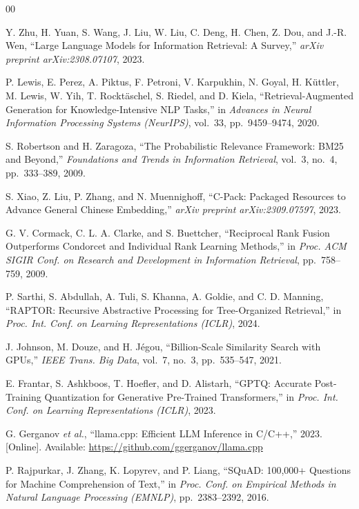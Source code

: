 \documentclass[conference]{IEEEtran}
\begin{document}
\begin{thebibliography}{00}

Y. Zhu, H. Yuan, S. Wang, J. Liu, W. Liu, C. Deng, H. Chen, Z. Dou,
and J.-R. Wen,
``Large Language Models for Information Retrieval: A Survey,''
\textit{arXiv preprint arXiv:2308.07107}, 2023.

P. Lewis, E. Perez, A. Piktus, F. Petroni, V. Karpukhin, N. Goyal,
H. K{\"u}ttler, M. Lewis, W. Yih, T. Rockt{\"a}schel, S. Riedel, and D. Kiela,
``Retrieval-Augmented Generation for Knowledge-Intensive {NLP} Tasks,''
in \textit{Advances in Neural Information Processing Systems (NeurIPS)},
vol.~33, pp.~9459--9474, 2020.

S. Robertson and H. Zaragoza,
``The Probabilistic Relevance Framework: {BM25} and Beyond,''
\textit{Foundations and Trends in Information Retrieval},
vol.~3, no.~4, pp.~333--389, 2009.

S. Xiao, Z. Liu, P. Zhang, and N. Muennighoff,
``{C-Pack}: Packaged Resources to Advance General {Chinese} Embedding,''
\textit{arXiv preprint arXiv:2309.07597}, 2023.

G. V. Cormack, C. L. A. Clarke, and S. Buettcher,
``Reciprocal Rank Fusion Outperforms {Condorcet} and Individual Rank Learning
Methods,''
in \textit{Proc. ACM SIGIR Conf. on Research and Development in Information
Retrieval}, pp.~758--759, 2009.

P. Sarthi, S. Abdullah, A. Tuli, S. Khanna, A. Goldie, and C. D. Manning,
``{RAPTOR}: Recursive Abstractive Processing for Tree-Organized Retrieval,''
in \textit{Proc. Int. Conf. on Learning Representations (ICLR)}, 2024.

J. Johnson, M. Douze, and H. J{\'e}gou,
``Billion-Scale Similarity Search with {GPUs},''
\textit{IEEE Trans. Big Data}, vol.~7, no.~3, pp.~535--547, 2021.

E. Frantar, S. Ashkboos, T. Hoefler, and D. Alistarh,
``{GPTQ}: Accurate Post-Training Quantization for Generative Pre-Trained
Transformers,''
in \textit{Proc. Int. Conf. on Learning Representations (ICLR)}, 2023.

G. Gerganov \textit{et al.},
``llama.cpp: Efficient {LLM} Inference in {C/C++},''
2023. [Online]. Available: \url{https://github.com/ggerganov/llama.cpp}

P. Rajpurkar, J. Zhang, K. Lopyrev, and P. Liang,
``{SQuAD}: 100{,}000+ Questions for Machine Comprehension of Text,''
in \textit{Proc. Conf. on Empirical Methods in Natural Language Processing
(EMNLP)}, pp.~2383--2392, 2016.


\end{thebibliography}
\end{document}
